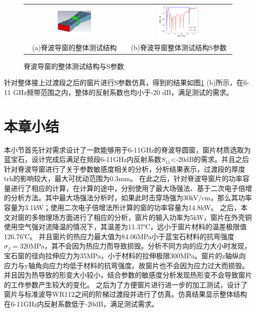 \documentclass[master]{thesis-uestc}
\begin{document}
\begin{figure}[!htb]
    \small
    \centering
    \begin{tabular}{@{\ }c@{\ }c}
        \includegraphics[width=0.35\textwidth]{pic/chapter3/脊波导窗整体测试结构.png} & 
        \hspace{5pt}
        \includegraphics[width=0.4\textwidth]{pic/chapter3/脊波导窗整体S参数.png}     \\
        \mbox{\small (a)脊波导窗的整体测试结构}                                                                               & 
        \mbox{\small (b)脊波导窗整体测试结构S参数}                                                                                  \\
    \end{tabular}
    \caption{脊波导窗的整体测试结构与S参数}
    \label{fig:脊波导窗的整体测试结构与S参数}
\end{figure}

针对整体接上过渡段之后的窗片进行S参数仿真，得到的结果如图\ref{fig:脊波导窗的整体测试结构与S参数} (b)所示，在6-11 GHz频带范围之内，整体的反射系数也均小于-20 dB，满足测试的需求。


\section{本章小结}
本小节首先针对需求设计了一款能够用于6-11GHz的脊波导圆窗，窗片材质选取为蓝宝石，设计完成后满足在频段6-11GHz内反射系数\(S_{11}\)<-20dB的需求。并且之后针对脊波导窗进行了关于参数敏感度相关的分析，分析结果表示，过渡段的厚度trh的影响较大，最大可扰动范围为0.3mm。
在此之后，针对脊波导窗片的功率容量进行了相应的计算，在计算的途中，分别使用了最大场强法、基于二次电子倍增的分析方法。其中最大场强法分析时，如果此时击穿场强为30kV/cm，那么其功率容量为3.1kW；使用二次电子倍增法所计算的窗的功率容量为14.8kW。
之后，本文对窗的多物理场方面进行了相应的分析，窗片的输入功率为5kW，窗片在外壳铜使用空气强对流降温的情况下，其温差为11.37℃，远小于窗片材料的温差极限值126.76℃。
并且窗片的热应力最大值为84.06MPa小于蓝宝石材料的抗弯强度\(\sigma_f = 320\)MPa，其不会因为热应力而导致损毁。分析不同方向的应力大小时发现，宝石窗的径向拉伸应力为35MPa，小于材料的拉伸极限300MPa。窗片的z轴纵向应力与y轴角向应力均低于材料的抗弯强度。故窗片也不会因为应力过大而损毁。
并且因为热导致的形变大小较小，结合参数的敏感度分析发现热形变不会导致窗片的工作参数产生较大的变化。
之后为了方便窗片进行进一步的加工测试，设计了窗片与标准波导WR112之间的阶梯过渡段并进行了仿真。仿真结果显示整体结构在6-11GHz内反射系数低于-20dB，满足测试需求。
\end{document}
